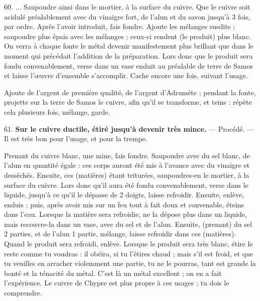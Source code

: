 \documentclass[a4paper, 11pt, oneside, polutonikogreek, french]{article}
\begin{document}
60. ... Saupoudre ainsi dans le mortier, à la surface du cuivre. Que le cuivre soit acidulé préalablement avec du vinaigre fort, de l'alun et du savon jusqu'à 3 fois, par ordre. Après l'avoir introduit, fais fondre. Ajoute les mélanges susdits ; saupoudre plus épais avec les mélanges ; ceux-ci rendent (le produit) plus blanc. On verra à chaque fonte le métal devenir manifestement plus brillant que dans le moment qui précédait l'addition de la préparation. Lors donc que le produit sera fondu convenablement, verse dans un vase enduit au préalable de terre de Samos et laisse l'œuvre d'ensemble s'accomplir. Cache encore une fois, suivant l'usage.

Ajoute de l'argent de première qualité, de l'argent d'Adrumète ; pendant la fonte, projette sur la terre de Samos le cuivre, afin qu'il se transforme, et teins : répète cela plusieurs fois, mélange, garde.

61. \textbf{Sur le cuivre ductile, étiré jusqu'à devenir très mince.} --- Procédé. --- Il est très bon pour l'usage, et pour la trempe.

Prenant du cuivre blanc, une mine, fais fondre. Saupoudre avec du sel blanc, de l'alun en quantité égale : ces corps auront été mis à l'avance avec du vinaigre et desséchés. Ensuite, ces (matières) étant triturées, saupoudres-en le mortier, à la surface du cuivre. Lors donc qu'il aura été fondu convenablement, verse dans le liquide, jusqu'à ce qu'il le dépasse de 2 doigts, laisse refroidir. Ensuite, enlève, enduis ; puis, après avoir mis sur un feu tout à fait doux et convenable, éteins dans l'eau. Lorsque la matière sera refroidie, ne la dépose plus dans un liquide, mais recouvre-la dans un vase, avec du sel et de l'alun. Ensuite, (prenant) du sel 2 parties, et de l'alun 1 partie, mélange, laisse refroidir dans ces (matières). Quand le produit sera refroidi, enlève. Lorsque le produit sera très blanc, étire le reste comme tu voudras : il obéira, si tu l'étires chaud ; mais s'il est froid, et que tu veuilles en arracher violemment une partie, tu ne le pourras, tant est grande la bonté et la ténacité du métal. C'est là un métal excellent ; on en a fait l'expérience. Le cuivre de Chypre est plus propre à ces usages ; tu dois le comprendre.
\end{document}
